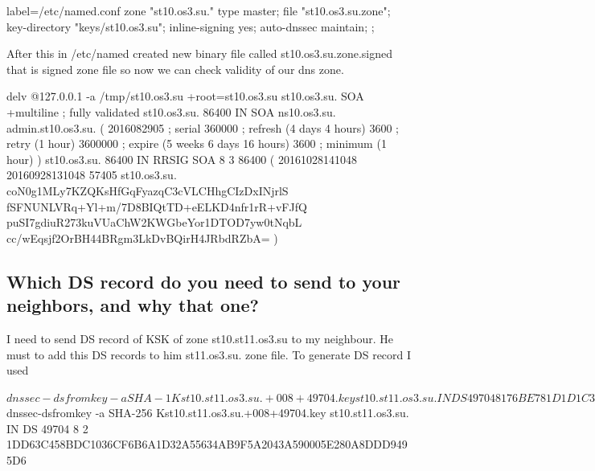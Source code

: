 \documentclass[a4paper,11pt]{article}
\begin{document}
\begin{bashcode*}{label=/etc/named.conf}
zone "st10.os3.su." {
        type master;
        file "st10.os3.su.zone";
        key-directory "keys/st10.os3.su";
        inline-signing yes;
        auto-dnssec maintain;
};
\end{bashcode*}
After this in /etc/named created new binary file called st10.os3.su.zone.signed that is signed zone file so now we can check validity of our dns zone.

\begin{bashcode}
delv @127.0.0.1 -a /tmp/st10.os3.su +root=st10.os3.su st10.os3.su. SOA +multiline
; fully validated
st10.os3.su.		86400 IN SOA ns10.os3.su. admin.st10.os3.su. (
				2016082905 ; serial
				360000     ; refresh (4 days 4 hours)
				3600       ; retry (1 hour)
				3600000    ; expire (5 weeks 6 days 16 hours)
				3600       ; minimum (1 hour)
				)
st10.os3.su.		86400 IN RRSIG SOA 8 3 86400 (
				20161028141048 20160928131048 57405 st10.os3.su.
				coN0g1MLy7KZQKsHfGqFyazqC3cVLCHhgCIzDxINjrlS
				fSFNUNLVRq+Yl+m/7D8BIQtTD+eELKD4nfr1rR+vFJfQ
				puSI7gdiuR273kuVUaChW2KWGbeYor1DTOD7yw0tNqbL
				cc/wEqsjf2OrBH44BRgm3LkDvBQirH4JRbdRZbA= )	
\end{bashcode}

\subsection{Which DS record do you need to send to your neighbors, and why that one?}
I need to send DS record of KSK of zone st10.st11.os3.su to my neighbour. He must to add this DS records to him st11.os3.su. zone file. To generate DS record I used
\begin{bashcode}
$ dnssec-dsfromkey -a SHA-1 Kst10.st11.os3.su.+008+49704.key 
st10.st11.os3.su. IN DS 49704 8 1 76BE781D1D1C3D672AFEFA0736694138F7EB3611

$ dnssec-dsfromkey -a SHA-256 Kst10.st11.os3.su.+008+49704.key 
st10.st11.os3.su. IN DS 49704 8 2 1DD63C458BDC1036CF6B6A1D32A55634AB9F5A2043A590005E280A8DDD9495D6
\end{bashcode}
\end{document}
